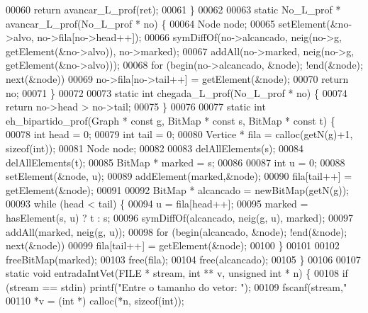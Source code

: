 \begin{DoxyCode}
00060         \textcolor{keywordflow}{return} avancar\_L\_prof(ret);
00061 \}
00062 
00063 \textcolor{keyword}{static} No\_L\_prof * avancar\_L\_prof(No\_L\_prof * no) \{
00064         Node node;
00065         setElement(&no->alvo, no->fila[no->head++]);
00066         symDiffOf(no->alcancado, neig(no->g, getElement(&no->alvo)), no->marked);
00067         addAll(no->marked, neig(no->g, getElement(&no->alvo)));
00068         \textcolor{keywordflow}{for} (begin(no->alcancado, &node); !end(&node); next(&node))
00069                 no->fila[no->tail++] = getElement(&node);
00070         \textcolor{keywordflow}{return} no;
00071 \}
00072 
00073 \textcolor{keyword}{static} \textcolor{keywordtype}{int} chegada\_L\_prof(No\_L\_prof * no) \{
00074         \textcolor{keywordflow}{return} no->head > no->tail;
00075 \}
00076 
00077 \textcolor{keyword}{static} \textcolor{keywordtype}{int} eh\_bipartido\_prof(Graph * \textcolor{keyword}{const} g, BitMap * \textcolor{keyword}{const} s, BitMap * \textcolor{keyword}{const} t) \{
00078         \textcolor{keywordtype}{int} head = 0;
00079         \textcolor{keywordtype}{int} tail = 0;
00080         Vertice * fila = calloc(getN(g)+1, \textcolor{keyword}{sizeof}(\textcolor{keywordtype}{int}));
00081         Node node;
00082 
00083         delAllElements(s);
00084         delAllElements(t);
00085         BitMap * marked = s;
00086 
00087         \textcolor{keywordtype}{int} u = 0;
00088         setElement(&node, u);
00089         addElement(marked,&node);
00090         fila[tail++] = getElement(&node);
00091 
00092         BitMap * alcancado = newBitMap(getN(g));
00093         \textcolor{keywordflow}{while} (head < tail) \{
00094                 u = fila[head++];
00095                 marked = hasElement(s, u) ? t : s;
00096                 symDiffOf(alcancado, neig(g, u), marked);
00097                 addAll(marked, neig(g, u));
00098                 \textcolor{keywordflow}{for} (begin(alcancado, &node); !end(&node); next(&node))
00099                         fila[tail++] = getElement(&node);
00100         \}
00101 
00102         freeBitMap(marked);
00103         free(fila);
00104         free(alcancado);
00105 \}
00106 
00107 \textcolor{keyword}{static} \textcolor{keywordtype}{void} entradaIntVet(FILE * stream, \textcolor{keywordtype}{int} ** v, \textcolor{keywordtype}{unsigned} \textcolor{keywordtype}{int} * n) \{
00108         \textcolor{keywordflow}{if} (stream == stdin) printf(\textcolor{stringliteral}{"Entre o tamanho do vetor: "});
00109         fscanf(stream,\textcolor{stringliteral}{"%
00110         *v = (\textcolor{keywordtype}{int} *) calloc(*n, \textcolor{keyword}{sizeof}(\textcolor{keywordtype}{int}));
}
\end{DoxyCode}
